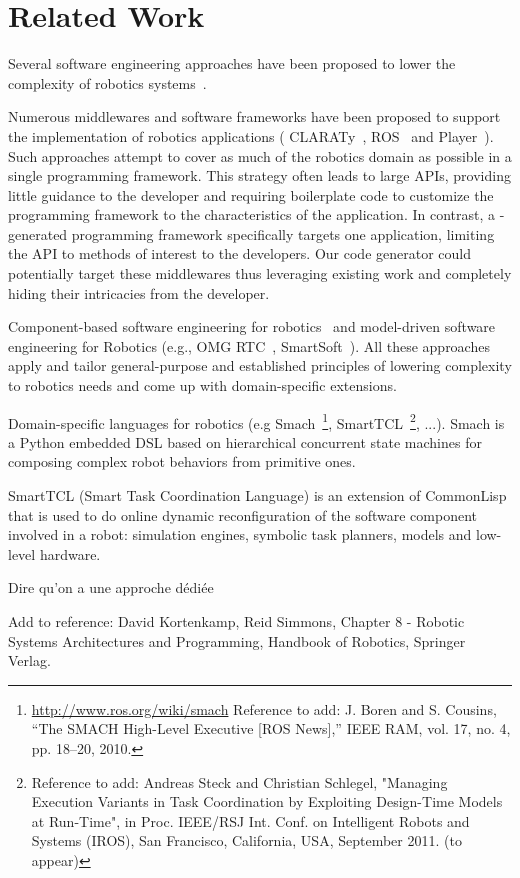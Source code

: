 
\section{Related Work}
\label{sec:related}

Several software engineering approaches have been proposed to lower
the complexity of robotics systems~\cite{Brug07a}.

Numerous middlewares and software frameworks have been proposed to
support the implementation of robotics applications (\eg{}
CLARATy~\cite{Claraty}, ROS~\cite{ROS} and Player~\cite{Coll05a}).
Such approaches attempt to cover as much of the robotics domain as
possible in a single programming framework. This strategy often leads
to large APIs, providing little guidance to the developer and
requiring boilerplate code to customize the programming framework to
the characteristics of the application. In contrast, a
\diaspec{}-generated programming framework specifically targets one
application, limiting the API to methods of interest to the
developers. Our code generator could potentially target these
middlewares thus leveraging existing work and completely hiding their
intricacies from the developer.

Component-based software engineering for robotics~\cite{Brug07b} and
model-driven software engineering for Robotics (e.g., OMG
RTC~\cite{OMGRTC}, SmartSoft~\cite{Schl09a}). All these approaches
apply and tailor general-purpose and established principles of
lowering complexity to robotics needs and come up with domain-specific
extensions.

Domain-specific languages for robotics (e.g Smach~\footnote{\url{http://www.ros.org/wiki/smach} Reference to add: J. Boren and S. Cousins, “The SMACH High-Level Executive [ROS News],” IEEE RAM, vol. 17, no. 4, pp. 18–20, 2010. }, SmartTCL~\footnote{Reference to add: Andreas Steck and Christian Schlegel, "Managing Execution Variants in Task Coordination by Exploiting Design-Time Models at Run-Time", in Proc. IEEE/RSJ Int. Conf. on Intelligent Robots and Systems (IROS), San Francisco, California, USA, September 2011. (to appear)}, ...).
Smach is a Python embedded DSL based on hierarchical concurrent state machines for composing complex robot behaviors from primitive ones.

SmartTCL (Smart Task Coordination Language) is an extension of CommonLisp that is used to do online dynamic reconfiguration of the software component involved in a robot: simulation engines, symbolic task planners, models and low-level hardware.

Dire qu'on a une approche dédiée

Add to reference: David Kortenkamp, Reid Simmons, Chapter 8 - Robotic Systems Architectures and Programming, Handbook of Robotics, Springer Verlag.
